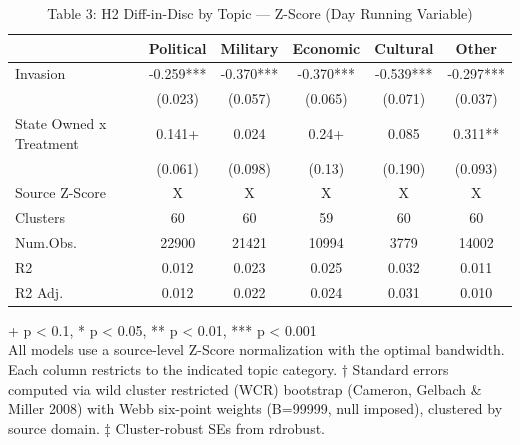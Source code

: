 \begin{table}[t]
\caption{\label{tab:table-03}Table 3: H2 Diff-in-Disc by Topic — Z-Score (Day Running Variable)} 
\fontsize{12.0pt}{14.0pt}\selectfont
\begin{tabular*}{\linewidth}{@{\extracolsep{\fill}}lccccc}
\toprule
  & Political & Military & Economic & Cultural & Other \\ 
\midrule\addlinespace[2.5pt]
Invasion & -0.259*** & -0.370*** & -0.370*** & -0.539*** & -0.297*** \\ 
 & (0.023) & (0.057) & (0.065) & (0.071) & (0.037) \\ 
State Owned x Treatment & 0.141+ & 0.024 & 0.24+ & 0.085 & 0.311** \\ 
{} & {(0.061)} & {(0.098)} & {(0.13)} & {(0.190)} & {(0.093)} \\ 
Source Z-Score & X & X & X & X & X \\ 
Clusters & 60 & 60 & 59 & 60 & 60 \\ 
Num.Obs. & 22900 & 21421 & 10994 & 3779 & 14002 \\ 
R2 & 0.012 & 0.023 & 0.025 & 0.032 & 0.011 \\ 
R2 Adj. & 0.012 & 0.022 & 0.024 & 0.031 & 0.010 \\ 
\bottomrule
\end{tabular*}
\begin{minipage}{\linewidth}
\vspace{.05em}
+ p < 0.1, * p < 0.05, ** p < 0.01, *** p < 0.001\\
All models use a source-level Z-Score normalization with the optimal bandwidth.
Each column restricts to the indicated topic category. † Standard errors
computed via wild cluster restricted (WCR) bootstrap (Cameron, Gelbach \& Miller
2008) with Webb six-point weights (B=99999, null imposed), clustered by source
domain. ‡ Cluster-robust SEs from rdrobust.\\
\end{minipage}
\end{table}

